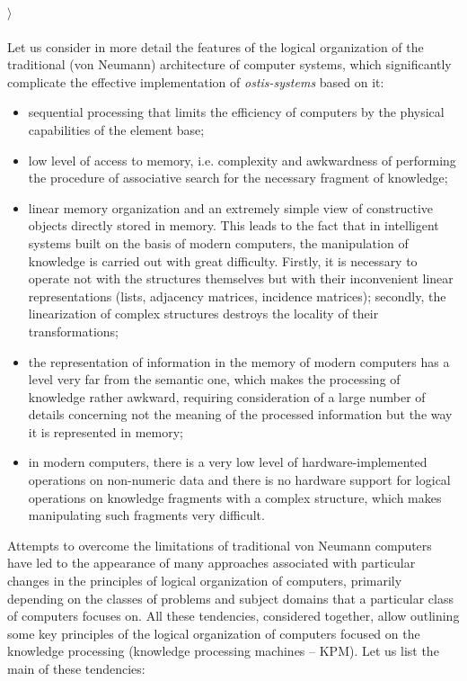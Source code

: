 \documentclass{article}
\begin{document}
\begin{multicols}{2}
\par \(\rangle\) \\ \\
Let us consider in more detail the features of the logical organization of the traditional (von Neumann) architecture of computer systems, which significantly complicate the effective implementation of \textit{ostis-systems} based on it:
\begin{itemize}
    \item sequential processing that limits the efficiency of computers by the physical capabilities of the element base;
    \item low level of access to memory, i.e. complexity and awkwardness of performing the procedure of associative search for the necessary fragment of knowledge;
    \item linear memory organization and an extremely simple view of constructive objects directly stored in memory. This leads to the fact that in intelligent systems built on the basis of modern computers, the manipulation of knowledge is carried out with great difficulty. Firstly, it is necessary to operate not with the structures themselves but with their inconvenient linear representations (lists, adjacency matrices, incidence matrices); secondly, the linearization of complex structures destroys the locality of their transformations;
    \item the representation of information in the memory of modern computers has a level very far from the semantic one, which makes the processing of knowledge rather awkward, requiring consideration of a large number of details concerning not the meaning of the processed information but the way it is represented in memory;
    \item in modern computers, there is a very low level of hardware-implemented operations on non-numeric data and there is no hardware support for logical operations on knowledge fragments with a complex structure, which makes manipulating such fragments very difficult.
\end{itemize}
\par Attempts to overcome the limitations of traditional von Neumann computers have led to the appearance of many approaches associated with particular changes in the principles of logical organization of computers, primarily depending on the classes of problems and subject domains that a particular class of computers focuses on. All these tendencies, considered together, allow outlining some key principles of the logical organization of computers focused on the knowledge processing (knowledge processing machines – KPM). Let us list the main of these tendencies:

\end{multicols}
\end{document}
